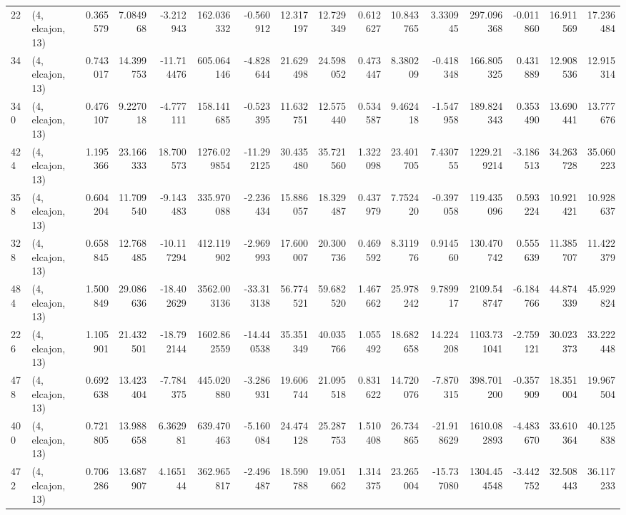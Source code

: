 \begin{tabular}{llrrrrrrrrrrrrrr}
22  &  (4, elcajon, 13) &   0.365579 &   7.084968 &  -3.212943 &   162.036332 &  -0.560912 &  12.317197 &  12.729349 &  0.612627 &  10.843765 &   3.330945 &   297.096368 & -0.011860 &  16.911569 &  17.236484 \\
34  &  (4, elcajon, 13) &   0.743017 &  14.399753 & -11.714476 &   605.064146 &  -4.828644 &  21.629498 &  24.598052 &  0.473447 &   8.380209 &  -0.418348 &   166.805325 &  0.431889 &  12.908536 &  12.915314 \\
340 &  (4, elcajon, 13) &   0.476107 &   9.227018 &  -4.777111 &   158.141685 &  -0.523395 &  11.632751 &  12.575440 &  0.534587 &   9.462418 &  -1.547958 &   189.824343 &  0.353490 &  13.690441 &  13.777676 \\
424 &  (4, elcajon, 13) &   1.195366 &  23.166333 &  18.700573 &  1276.029854 & -11.292125 &  30.435480 &  35.721560 &  1.322098 &  23.401705 &   7.430755 &  1229.219214 & -3.186513 &  34.263728 &  35.060223 \\
358 &  (4, elcajon, 13) &   0.604204 &  11.709540 &  -9.143483 &   335.970088 &  -2.236434 &  15.886057 &  18.329487 &  0.437979 &   7.752420 &  -0.397058 &   119.435096 &  0.593224 &  10.921421 &  10.928637 \\
328 &  (4, elcajon, 13) &   0.658845 &  12.768485 & -10.117294 &   412.119902 &  -2.969993 &  17.600007 &  20.300736 &  0.469592 &   8.311976 &   0.914560 &   130.470742 &  0.555639 &  11.385707 &  11.422379 \\
484 &  (4, elcajon, 13) &   1.500849 &  29.086636 & -18.402629 &  3562.003136 & -33.313138 &  56.774521 &  59.682520 &  1.467662 &  25.978242 &   9.789917 &  2109.548747 & -6.184766 &  44.874339 &  45.929824 \\
226 &  (4, elcajon, 13) &   1.105901 &  21.432501 & -18.792144 &  1602.862559 & -14.440538 &  35.351349 &  40.035766 &  1.055492 &  18.682658 &  14.224208 &  1103.731041 & -2.759121 &  30.023373 &  33.222448 \\
478 &  (4, elcajon, 13) &   0.692638 &  13.423404 &  -7.784375 &   445.020880 &  -3.286931 &  19.606744 &  21.095518 &  0.831622 &  14.720076 &  -7.870315 &   398.701200 & -0.357909 &  18.351004 &  19.967504 \\
400 &  (4, elcajon, 13) &   0.721805 &  13.988658 &   6.362981 &   639.470463 &  -5.160084 &  24.474128 &  25.287753 &  1.510408 &  26.734865 & -21.918629 &  1610.082893 & -4.483670 &  33.610364 &  40.125838 \\
472 &  (4, elcajon, 13) &   0.706286 &  13.687907 &   4.165144 &   362.965817 &  -2.496487 &  18.590788 &  19.051662 &  1.314375 &  23.265004 & -15.737080 &  1304.454548 & -3.442752 &  32.508443 &  36.117233 \\

\end{tabular}
